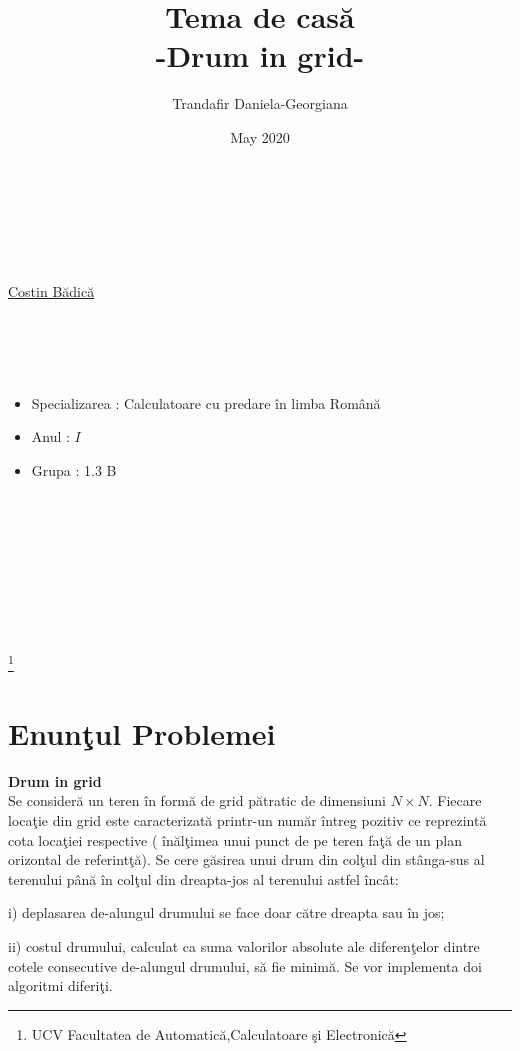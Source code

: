 \documentclass{article}
\begin{document}

\title{Tema de cas\u{a}\\-Drum in grid- \\}
\author{\Large{Trandafir Daniela-Georgiana }}
\date{May 2020}


\maketitle

\begin{tabbing}
\\
\\
\\
\\
  \=\href{http://software.ucv.ro/~cbadica}{Costin B\u{a}dic\u{a}} \\
\\
\\
\\
\\
\end{tabbing}


\begin{itemize}
  \item Specializarea : Calculatoare cu predare \^{i}n limba Rom\^{a}n\u{a}
  \item Anul : $I$
  \item Grupa : 1.3 B
\end{itemize}
\\
\\\
\\\
\\\
\\\
\\\
\\ \  
\\
\thanks{UCV Facultatea de Automatic\u{a},Calculatoare \c{s}i Electronic\u{a}}
\vfill


\pagebreak


\section{Enun\c{t}ul Problemei}
\textbf{Drum in grid}
\\Se consider\u{a} un teren \^{i}n form\u{a} de grid p\u{a}tratic de dimensiuni $N\times N$. Fiecare loca\c{t}ie din grid este caracterizat\u{a} printr-un num\u{a}r \^{i}ntreg pozitiv ce reprezint\u{a} cota loca\c{t}iei respective ( \^{i}n\u{a}l\c{t}imea unui punct de pe
teren fa\c{t}\u{a} de un plan orizontal de referint\c{t}\u{a}). Se cere g\u{a}sirea unui drum
din col\c{t}ul din st\^{a}nga-sus al terenului p\^{a}n\u{a} \^{i}n col\c{t}ul din dreapta-jos al
terenului astfel \^{i}nc\^{a}t:
\par i) deplasarea de-alungul drumului se face doar c\u{a}tre
dreapta sau \^{i}n jos; 
\par ii) costul drumului, calculat ca suma valorilor absolute
ale diferen\c{t}elor dintre cotele  consecutive de-alungul drumului, s\u{a}
fie minim\u{a}. Se vor implementa doi algoritmi diferi\c{t}i.
\end{document}
